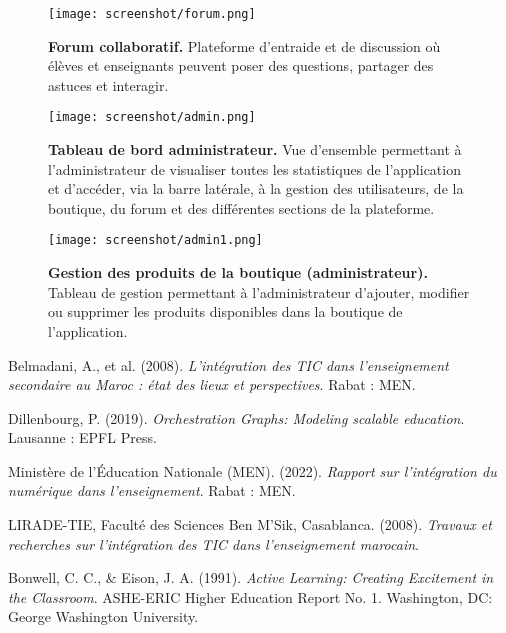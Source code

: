 \documentclass[a4paper,11pt]{report}
\begin{document}
\begin{figure}[H]
    \centering
    \texttt{[image: screenshot/forum.png]}
    \caption{\textbf{Forum collaboratif.} Plateforme d'entraide et de discussion où élèves et enseignants peuvent poser des questions, partager des astuces et interagir.}
\end{figure}

\begin{figure}[H]
    \centering
    \texttt{[image: screenshot/admin.png]}
    \caption{\textbf{Tableau de bord administrateur.} Vue d'ensemble permettant à l'administrateur de visualiser toutes les statistiques de l'application et d'accéder, via la barre latérale, à la gestion des utilisateurs, de la boutique, du forum et des différentes sections de la plateforme.}
\end{figure}

\begin{figure}[H]
    \centering
    \texttt{[image: screenshot/admin1.png]}
    \caption{\textbf{Gestion des produits de la boutique (administrateur).} Tableau de gestion permettant à l'administrateur d'ajouter, modifier ou supprimer les produits disponibles dans la boutique de l'application.}
\end{figure}

\renewcommand{\bibname}{Bibliographie}
\begin{thebibliography}{99}

Belmadani, A., et al. (2008). \textit{L'intégration des TIC dans l'enseignement secondaire au Maroc : état des lieux et perspectives}. Rabat : MEN.

Dillenbourg, P. (2019). \textit{Orchestration Graphs: Modeling scalable education}. Lausanne : EPFL Press.

Ministère de l'Éducation Nationale (MEN). (2022). \textit{Rapport sur l'intégration du numérique dans l'enseignement}. Rabat : MEN.

LIRADE-TIE, Faculté des Sciences Ben M'Sik, Casablanca. (2008). \textit{Travaux et recherches sur l'intégration des TIC dans l'enseignement marocain}.

Bonwell, C. C., \& Eison, J. A. (1991). \textit{Active Learning: Creating Excitement in the Classroom}. ASHE-ERIC Higher Education Report No. 1. Washington, DC: George Washington University.


\end{thebibliography}
\end{document}
